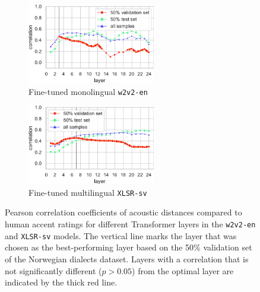 \documentclass[11pt,a4paper]{article}
\begin{document}
\begin{figure}[ht]
     \centering
     \begin{subfigure}[b]{0.49\textwidth}
         \centering
         \includegraphics[width=2.2in]{figures/Norwegian/wav2vec2-large-960h.pdf}
         \caption{Fine-tuned monolingual \texttt{w2v2-en}}
         \label{fig:curveW2V2-ENNOS}
      \end{subfigure}
      \begin{subfigure}[b]{0.49\textwidth}
         \centering
         \includegraphics[width=2.2in]{figures/Norwegian/wav2vec2-large-xlsr-53-swedish.pdf}
         \caption{Fine-tuned multilingual \texttt{XLSR-sv}}
         \label{fig:curveXLSR-SVNOS}
     \end{subfigure}
     \caption{Pearson correlation coefficients of acoustic distances compared to human accent ratings for different Transformer layers in the \texttt{w2v2-en} and \texttt{XLSR-sv} models. The vertical line marks the layer that was chosen as the best-performing layer based on the 50\% validation set of the Norwegian dialects dataset. Layers with a correlation that is  not significantly different ($p > 0.05$) from the optimal layer are indicated by the thick red line.}
     \label{fig:curveNOS}
\end{figure}
\end{document}
